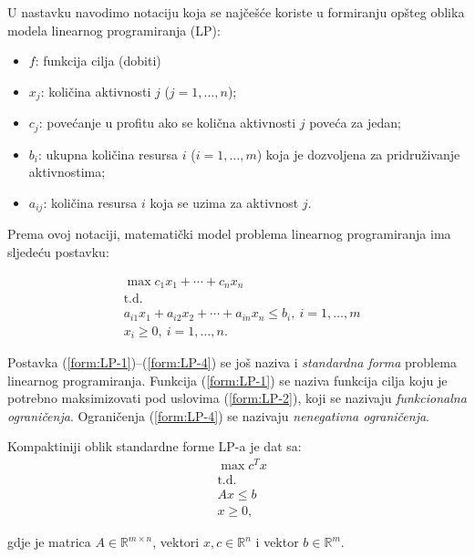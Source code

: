\documentclass[b5paper, utf8, 11pt, colorlinks]{book}
\theoremstyle{definition}
\begin{document}
 U nastavku navodimo notaciju koja se najčešće koriste u formiranju opšteg oblika modela linearnog programiranja (LP):

 \begin{itemize}
     \item $f$: funkcija cilja (dobiti) 
     \item $x_j$: količina aktivnosti $j$ ($j = 1,\ldots,n$);
     \item $c_j$: povećanje u profitu ako se količna aktivnosti $j$ poveća za jedan; %
     \item $b_i$: ukupna količina resursa $i$ ($i=1,\ldots,m$) koja je dozvoljena za pridruživanje aktivnostima;
     \item $a_{ij}$: količina resursa $i$ koja se uzima za aktivnost $j$.
 \end{itemize}
 Prema ovoj notaciji, matematički model problema linearnog programiranja ima sljedeću postavku:
  
 \begin{align} 
       &\max  c_1 x_1 + \cdots + c_n x_n  \label{form:LP-1}\\
       & \mbox{t.d.} \nonumber \\
       & a_{i1}x_1 + a_{i2} x_{2} + \cdots + a_{in}x_n \leq b_i,\ i=1,\ldots,m \label{form:LP-2} \\
       & x_i \geq 0,\ i=1,\ldots,n.\label{form:LP-4}
 \end{align}

Postavka (\ref{form:LP-1})--(\ref{form:LP-4}) se još naziva i \emph{standardna forma} problema linearnog programiranja. Funkcija (\ref{form:LP-1}) se naziva funkcija cilja koju je potrebno maksimizovati pod uslovima (\ref{form:LP-2}), koji se nazivaju \emph{funkcionalna ograničenja}. Ograničenja (\ref{form:LP-4}) se nazivaju \emph{nenegativna ograničenja}. 

 Kompaktiniji oblik standardne forme LP-a je dat sa:
 \begin{align}
     & \max c^T x  \label{eq:LP-o1}\\
     & \mbox{t.d.} \nonumber \\
     &  A x \leq b \label{eq:LP-c1} \\
     & x \geq 0 \label{eq:LP-c2},
 \end{align}

 gdje je matrica $A \in \mathbb{R}^{m \times n}$, vektori  $x,c \in \mathbb{R}^n$ i vektor $b \in \mathbb{R}^{m}$.
\end{document}
